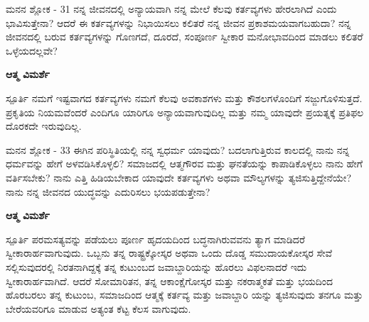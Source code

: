 \begin{mananam}{\mananamfont ಮನನ ಶ್ಲೋಕ - \textenglish{31}}
\footnotesize \mananamtext ನನ್ನ ಜೀವನದಲ್ಲಿ ಅನ್ಯಾಯವಾಗಿ ನನ್ನ ಮೇಲೆ ಕೆಲವು ಕರ್ತವ್ಯಗಳು ಹೇರಲಾಗಿದೆ ಎಂದು ಭಾವಿಸುತ್ತೇನಾ? ಆದರೆ ಈ ಕರ್ತವ್ಯಗಳನ್ನು ನಿಭಾಯಿಸಲು ಕಲಿತರೆ ನನ್ನ ಜೀವನ ಪ್ರಕಾಶಮಯವಾಗಬಹುದಾ? ನನ್ನ ಜೀವನದಲ್ಲಿ ಬರುವ ಕರ್ತವ್ಯಗಳನ್ನು ಗೊಣಗದೆ, ದೂರದೆ, ಸಂಪೂರ್ಣ ಸ್ವೀಕಾರ ಮನೋಭಾವದಿಂದ ಮಾಡಲು ಕಲಿತರೆ ಒಳ್ಳೆಯದಲ್ಲವೇ?
\end{mananam}
\WritingHand\enspace\textbf{ಆತ್ಮ ವಿಮರ್ಶೆ}
\begin{inspiration}{\mananamfont ಸ್ಪೂರ್ತಿ}
\footnotesize \mananamtext ನಮಗೆ ಇಷ್ಟವಾಗದ ಕರ್ತವ್ಯಗಳು ನಮಗೆ ಕೆಲವು ಅವಕಾಶಗಳು ಮತ್ತು ಕೌಶಲಗಳೊಂದಿಗೆ ಸಜ್ಜುಗೊಳಿಸುತ್ತದೆ. ಪ್ರಕೃತಿಯ ನಿಯಮವೆಂದರೆ ಎಂದಿಗೂ ಯಾರಿಗೂ ಅನ್ಯಾಯವಾಗುವುದಿಲ್ಲ ಮತ್ತು ನಮ್ಮ ಯಾವುದೇ ಪ್ರಯತ್ನಕ್ಕೆ ಪ್ರತಿಫಲ ದೊರಕದೇ ಇರುವುದಿಲ್ಲ.
\end{inspiration}
\newpage

\begin{mananam}{\mananamfont ಮನನ ಶ್ಲೋಕ - \textenglish{33}}
\footnotesize \mananamtext ಈಗಿನ ಪರಿಸ್ಥಿತಿಯಲ್ಲಿ ನನ್ನ ಸ್ವಧರ್ಮ ಯಾವುದು? ಬದಲಾಗುತ್ತಿರುವ ಕಾಲದಲ್ಲಿ ನಾನು ನನ್ನ ಧರ್ಮವನ್ನು ಹೇಗೆ ಅಳವಡಿಸಿಕೊಳ್ಳಲಿ? ಸಮಾಜದಲ್ಲಿ ಆತ್ಮಗೌರವ ಮತ್ತು ಘನತೆಯನ್ನು ಕಾಪಾಡಿಕೊಳ್ಳಲು ನಾನು ಹೇಗೆ ವರ್ತಿಸಬೇಕು? ನಾನು ಎತ್ತಿ ಹಿಡಿಯಬೇಕಾದ ಯಾವುದೇ ಕರ್ತವ್ಯಗಳು ಅಥವಾ ಮೌಲ್ಯಗಳನ್ನು ತ್ಯಜಿಸುತ್ತಿದ್ದೇನೆಯೇ? ನಾನು ನನ್ನ ಜೀವನದ ಯುದ್ಧವನ್ನು ಎದುರಿಸಲು ಭಯಪಡುತ್ತೇನಾ?
\end{mananam}
\WritingHand\enspace\textbf{ಆತ್ಮ ವಿಮರ್ಶೆ}
\begin{inspiration}{\mananamfont ಸ್ಪೂರ್ತಿ}
\footnotesize \mananamtext ಪರಮಸತ್ಯವನ್ನು ಪಡೆಯಲು ಪೂರ್ಣ ಹೃದಯದಿಂದ ಬದ್ಧನಾಗಿರುವವನು ತ್ಯಾಗ ಮಾಡಿದರೆ ಸ್ವೀಕಾರಾರ್ಹವಾಗುವುದು. ಒಬ್ಬನು ತನ್ನ ರಾಷ್ಟ್ರಕ್ಕೋಸ್ಕರ ಅಥವಾ ಒಂದು ದೊಡ್ಡ ಸಮುದಾಯಕೋಸ್ಕರ ಸೇವೆ ಸಲ್ಲಿಸುವುದರಲ್ಲಿ ನಿರತನಾಗಿದ್ದಕ್ಕೆ ತನ್ನ ಕುಟುಂಬದ ಜವಾಬ್ದಾರಿಯನ್ನು ಹೊರಲು ವಿಫಲನಾದರೆ ಇದು ಸ್ವೀಕಾರಾರ್ಹವಾಗಿದೆ. ಆದರೆ ಸೋಮಾರಿತನ, ತನ್ನ ಆಕಾಂಕ್ಷೆಗೋಸ್ಕರ ಮತ್ತು ನಕರಾತ್ಮಕತೆ ಮತ್ತು ಭಯದಿಂದ ಹೊರಬರಲು ತನ್ನ ಕುಟುಂಬ, ಸಮಾಜದಿಂದ ಆತ್ಮಕ್ಕೆ ಕರ್ತವ್ಯ ಮತ್ತು ಜವಾಬ್ದಾರಿ ಯನ್ನು ತ್ಯಜಿಸುವುದು ತನಗೂ ಮತ್ತು ಬೇರೆಯವರಿಗೂ ಮಾಡುವ ಅತ್ಯಂತ ಕೆಟ್ಟ ಕೆಲಸ ವಾಗುವುದು.
\end{inspiration}
\newpage


